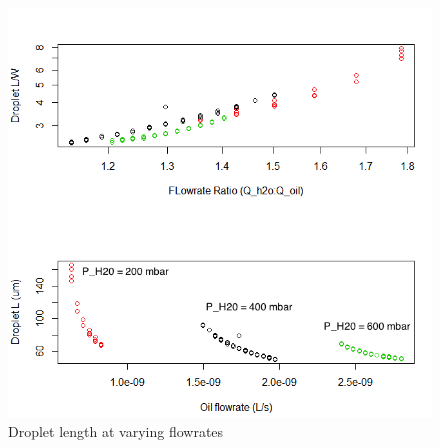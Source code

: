 \begin{figure}[h]
\centering 
\includegraphics[width=0.750\columnwidth]{constP.PNG} 
\caption[Regime Change at varying flows]{Droplet length at varying flowrates} 
\label{fig:constP} 
\end{figure}

